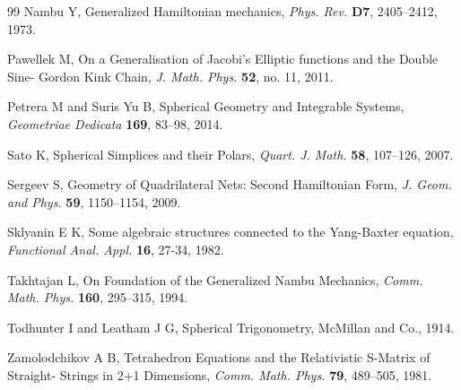 \documentclass[fleqn,11pt,twoside]{article}
\theoremstyle{definition}
\begin{document}
\begin{thebibliography}{99}
 Nambu Y, %
Generalized Hamiltonian mechanics, {\it Phys. Rev.} {\bf D7}, 2405--2412, 1973.

Pawellek M, On a Generalisation of Jacobi’s Elliptic functions and the Double Sine-
Gordon Kink Chain, {\it  J. Math. Phys.} {\bf 52}, no. 11, 2011.


Petrera M and Suris Yu B, Spherical Geometry and Integrable Systems, 
{\it Geometriae Dedicata} {\bf 169}, 83--98, 2014. 


 Sato K, Spherical Simplices and their Polars, {\it Quart. J. Math.} {\bf 58}, 107--126, 2007.

Sergeev S, Geometry of Quadrilateral Nets: Second Hamiltonian Form, 
{\it J. Geom. and Phys.} {\bf 59}, 1150--1154, 2009.

Sklyanin E K, Some algebraic structures connected to the Yang-Baxter equation, 
{\it Functional Anal. Appl.} {\bf 16}, 27-34, 1982.


Takhtajan L, On Foundation of the Generalized Nambu Mechanics, 
{\it  Comm. Math. Phys.}  {\bf 160}, 295--315, 1994.

Todhunter I and Leatham J G, Spherical Trigonometry, McMillan and Co., 1914.

Zamolodchikov A B, Tetrahedron Equations and the Relativistic S-Matrix of Straight-
Strings in 2+1 Dimensions, {\it Comm. Math. Phys.} {\bf 79}, 489--505, 1981.



\end{thebibliography}

\label{lastpage}
\end{document}
